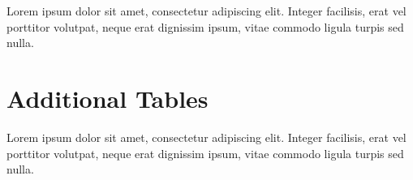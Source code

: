 Lorem ipsum dolor sit amet, consectetur adipiscing elit. Integer facilisis, erat vel porttitor volutpat, neque erat dignissim ipsum, vitae commodo ligula turpis sed nulla.

\section{Additional Tables}

Lorem ipsum dolor sit amet, consectetur adipiscing elit. Integer facilisis, erat vel porttitor volutpat, neque erat dignissim ipsum, vitae commodo ligula turpis sed nulla.
